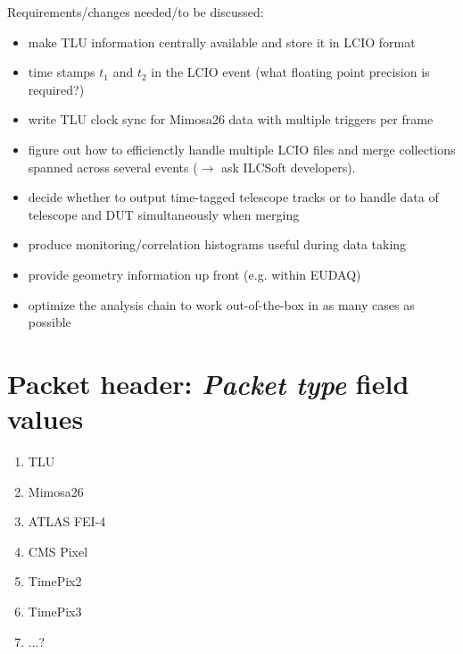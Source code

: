 \documentclass[paper=a4, fontsize=11pt]{scrartcl}	%
\numberwithin{equation}{section}		%
\numberwithin{figure}{section}			%
\numberwithin{table}{section}				%
\begin{document}
Requirements/changes needed/to be discussed:
\begin{itemize}
\item make TLU information centrally available and store it in LCIO format
\item time stamps $t_1$ and $t_2$ in the LCIO event (what floating
  point precision is required?)
\item write TLU clock sync for Mimosa26 data with multiple triggers
  per frame
\item figure out how to efficienctly handle multiple LCIO files and merge
  collections spanned across several events ($\rightarrow$ ask ILCSoft developers).
\item decide whether to output time-tagged telescope tracks or to
  handle data of telescope and DUT simultaneously when merging
\item produce monitoring/correlation histograms useful during data taking
\item provide geometry information up front (e.g. within EUDAQ)
\item optimize the analysis chain to work out-of-the-box in as many
  cases as possible
\end{itemize}

\newpage
\appendix

\section{Packet header: \emph{Packet type} field values}
\label{app:packettype}
\begin{enumerate}
\item TLU
\item Mimosa26
\item ATLAS FEI-4
\item CMS Pixel
\item TimePix2
\item TimePix3
\item $\ldots$?
\end{enumerate}
\end{document}
